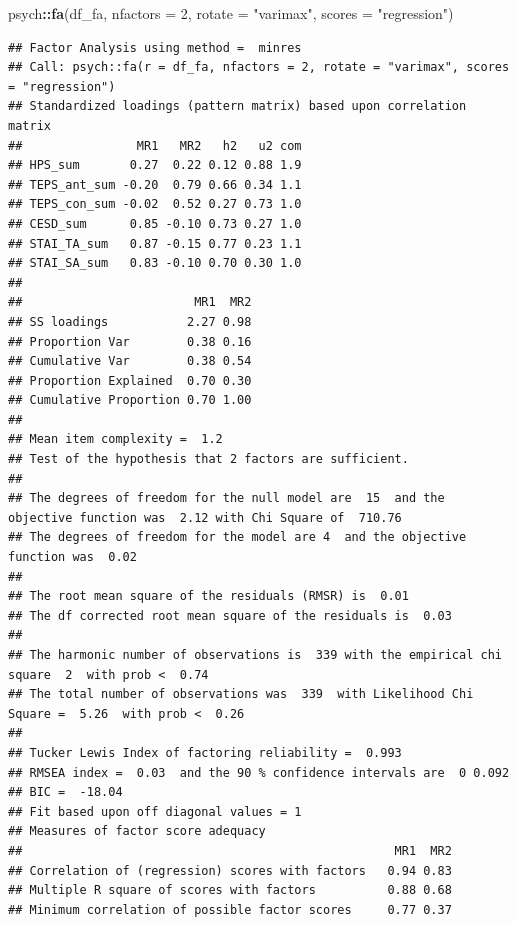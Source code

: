\documentclass[
]{article}
\newenvironment{Shaded}{\begin{snugshade}}{\end{snugshade}}
\newcommand{\AttributeTok}[1]{\textcolor[rgb]{0.13,0.29,0.53}{#1}}
\newcommand{\DecValTok}[1]{\textcolor[rgb]{0.00,0.00,0.81}{#1}}
\newcommand{\FunctionTok}[1]{\textcolor[rgb]{0.13,0.29,0.53}{\textbf{#1}}}
\newcommand{\NormalTok}[1]{#1}
\newcommand{\OtherTok}[1]{\textcolor[rgb]{0.56,0.35,0.01}{#1}}
\newcommand{\SpecialCharTok}[1]{\textcolor[rgb]{0.81,0.36,0.00}{\textbf{#1}}}
\newcommand{\StringTok}[1]{\textcolor[rgb]{0.31,0.60,0.02}{#1}}
\begin{document}
\begin{Shaded}
\begin{Highlighting}[]
\NormalTok{psych}\SpecialCharTok{::}\FunctionTok{fa}\NormalTok{(df\_fa, }\AttributeTok{nfactors =} \DecValTok{2}\NormalTok{,}
          \AttributeTok{rotate =} \StringTok{"varimax"}\NormalTok{,}
          \AttributeTok{scores =} \StringTok{"regression"}\NormalTok{)}
\end{Highlighting}
\end{Shaded}

\begin{verbatim}
## Factor Analysis using method =  minres
## Call: psych::fa(r = df_fa, nfactors = 2, rotate = "varimax", scores = "regression")
## Standardized loadings (pattern matrix) based upon correlation matrix
##                MR1   MR2   h2   u2 com
## HPS_sum       0.27  0.22 0.12 0.88 1.9
## TEPS_ant_sum -0.20  0.79 0.66 0.34 1.1
## TEPS_con_sum -0.02  0.52 0.27 0.73 1.0
## CESD_sum      0.85 -0.10 0.73 0.27 1.0
## STAI_TA_sum   0.87 -0.15 0.77 0.23 1.1
## STAI_SA_sum   0.83 -0.10 0.70 0.30 1.0
## 
##                        MR1  MR2
## SS loadings           2.27 0.98
## Proportion Var        0.38 0.16
## Cumulative Var        0.38 0.54
## Proportion Explained  0.70 0.30
## Cumulative Proportion 0.70 1.00
## 
## Mean item complexity =  1.2
## Test of the hypothesis that 2 factors are sufficient.
## 
## The degrees of freedom for the null model are  15  and the objective function was  2.12 with Chi Square of  710.76
## The degrees of freedom for the model are 4  and the objective function was  0.02 
## 
## The root mean square of the residuals (RMSR) is  0.01 
## The df corrected root mean square of the residuals is  0.03 
## 
## The harmonic number of observations is  339 with the empirical chi square  2  with prob <  0.74 
## The total number of observations was  339  with Likelihood Chi Square =  5.26  with prob <  0.26 
## 
## Tucker Lewis Index of factoring reliability =  0.993
## RMSEA index =  0.03  and the 90 % confidence intervals are  0 0.092
## BIC =  -18.04
## Fit based upon off diagonal values = 1
## Measures of factor score adequacy             
##                                                    MR1  MR2
## Correlation of (regression) scores with factors   0.94 0.83
## Multiple R square of scores with factors          0.88 0.68
## Minimum correlation of possible factor scores     0.77 0.37
\end{verbatim}

\begin{Shaded}
\end{Shaded}
\end{document}
